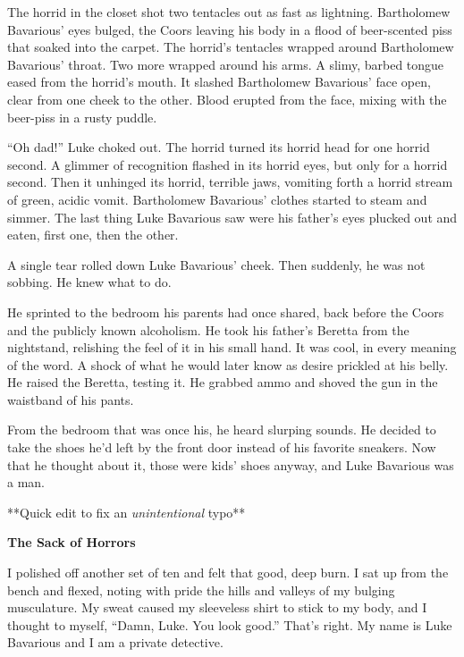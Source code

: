 The horrid in the closet shot two tentacles out as fast as
lightning. Bartholomew Bavarious' eyes bulged, the Coors
leaving his body in a flood of beer-scented piss that soaked into
the carpet. The horrid's tentacles wrapped around Bartholomew
Bavarious' throat. Two more wrapped around his arms. A slimy,
barbed tongue eased from the horrid's mouth. It slashed
Bartholomew Bavarious' face open, clear from one cheek to the
other. Blood erupted from the face, mixing with the beer-piss in a
rusty puddle.



``Oh dad!'' Luke choked out. The horrid turned its horrid
head for one horrid second. A glimmer of recognition flashed in its
horrid eyes, but only for a horrid second. Then it unhinged its
horrid, terrible jaws, vomiting forth a horrid stream of green,
acidic vomit. Bartholomew Bavarious' clothes started to steam
and simmer. The last thing Luke Bavarious saw were his
father's eyes plucked out and eaten, first one, then the
other.



A single tear rolled down Luke Bavarious' cheek. Then
suddenly, he was not sobbing. He knew what to do.



He sprinted to the bedroom his parents had once shared, back before
the Coors and the publicly known alcoholism. He took his
father's Beretta from the nightstand, relishing the feel of
it in his small hand. It was cool, in every meaning of the word. A
shock of what he would later know as desire prickled at his belly.
He raised the Beretta, testing it. He grabbed ammo and shoved the
gun in the waistband of his pants.



From the bedroom that was once his, he heard slurping sounds. He
decided to take the shoes he'd left by the front door instead
of his favorite sneakers. Now that he thought about it, those were
kids' shoes anyway, and Luke Bavarious was a man.



**Quick edit to fix an {\em unintentional} typo** 

 





{\bf The Sack of Horrors}



I polished off another set of ten and felt that good, deep burn. I
sat up from the bench and flexed, noting with pride the hills and
valleys of my bulging musculature. My sweat caused my sleeveless
shirt to stick to my body, and I thought to myself, ``Damn, Luke.
You look good.'' That's right. My name is Luke Bavarious and I am a
private detective.



